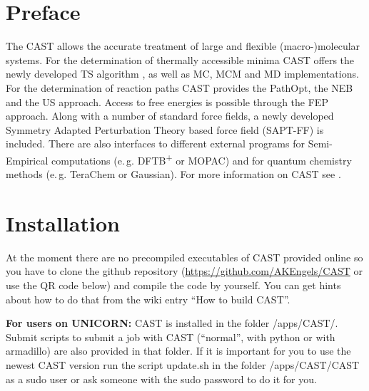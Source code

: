 \documentclass[10pt,a4paper]{article} %
\begin{document}
	\section{Preface}
	The \ac{CAST} allows the accurate treatment of large and flexible (macro-)molecular systems. For the determination of thermally accessible minima \ac{CAST} offers the newly developed \ac{TS} algorithm \supercite{tabusearch}, as well as \ac{MC}\supercite{mc_original}, \ac{MCM}\supercite{MCM_original} and \acf{MD}\supercite{computer_simulation_of_MD} implementations. For the determination of reaction paths \ac{CAST} provides the PathOpt\supercite{pathopt}, the \ac{NEB}\supercite{neb_original} and the \ac{US}\supercite{umbrella_sampling} approach. Access to free energies is possible through the \ac{FEP} approach. Along with a number of standard force fields, a newly developed Symmetry Adapted Perturbation Theory based force field (\acs{SAPT-FF}) is included. There are also interfaces to different external programs for Semi-Empirical computations (e.\,g. DFTB\textsuperscript{+}\supercite{dftb} or MOPAC\supercite{mopac, mopac_parallel}) and for quantum chemistry methods (e.\,g. TeraChem\supercite{terachem} or Gaussian). For more information on \ac{CAST} see \cite{cast}.

	\newpage

	\section{Installation}
	
	At the moment there are no precompiled executables of \ac{CAST} provided online so you have to clone the github repository (\url{https://github.com/AKEngels/CAST} or use the QR code below) and compile the code by yourself. You can get hints about how to do that from the wiki entry ``How to build CAST''. 
	
	\textbf{For users on UNICORN:} CAST is installed in the folder /apps/CAST/. Submit scripts to submit a job with CAST (``normal'', with python or with armadillo) are also provided in that folder. If it is important for you to use the newest CAST version run the script update.sh in the folder /apps/CAST/CAST as a sudo user or ask someone with the sudo password to do it for you.
	
\end{document}
